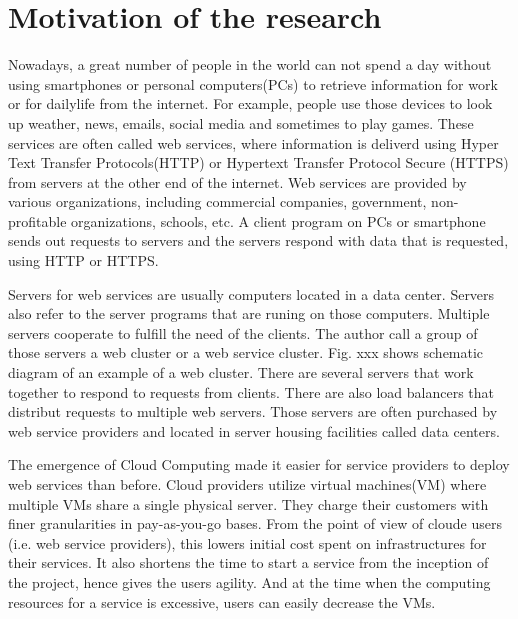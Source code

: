 
\section{Motivation of the research}
Nowadays, a great number of people in the world can not spend a day without using smartphones or personal computers(PCs) to retrieve information for work or for dailylife from the internet.
For example, people use those devices to look up weather, news, emails, social media and sometimes to play games.
These services are often called web services, where information is deliverd using Hyper Text Transfer Protocols(HTTP) or Hypertext Transfer Protocol Secure (HTTPS) from servers at the other end of the internet.
Web services are provided by various organizations, including commercial companies, government, non-profitable organizations, schools, etc.
A client program on PCs or smartphone sends out requests to servers and the servers respond with data that is requested, using HTTP or HTTPS. 

Servers for web services are usually computers located in a data center.
Servers also refer to the server programs that are runing on those computers. 
Multiple servers cooperate to fulfill the need of the clients.
The author call a group of those servers a web cluster or a web service cluster.
Fig. xxx shows schematic diagram of an example of a web cluster.
There are several servers that work together to respond to requests from clients.
There are also load balancers that distribut requests to multiple web servers.
Those servers are often purchased by web service providers and located in server housing facilities called data centers.

The emergence of Cloud Computing made it easier for service providers to deploy web services than before.
Cloud providers utilize virtual machines(VM) where multiple VMs share a single physical server.
They charge their customers with finer granularities in pay-as-you-go bases.
From the point of view of cloude users (i.e. web service providers), this lowers initial cost spent on infrastructures for their services.
It also shortens the time to start a service from the inception of the project, hence gives the users agility.
And at the time when the computing resources for a service is excessive, users can easily decrease the VMs.

